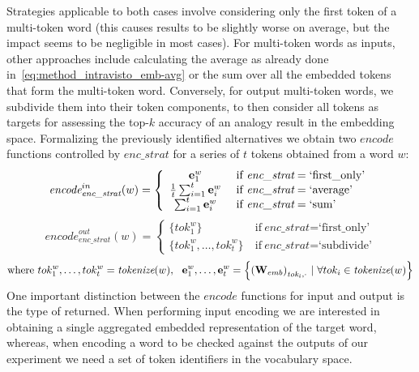 Strategies applicable to both cases involve considering only the first token of a multi-token word (this causes results to be slightly worse on average, but the impact seems to be negligible in most cases).
For multi-token words as inputs, other approaches include calculating the average as already done in~\cref{eq:method_intravisto_emb-avg} or the sum over all the embedded tokens that form the multi-token word.
Conversely, for output multi-token words, we subdivide them into their token components, to then consider all tokens as targets for assessing the top-$k$ accuracy of an analogy result in the embedding space.
Formalizing the previously identified alternatives we obtain two $\textit{encode}$ functions controlled by $\textit{enc\_strat}$ for a series of $t$ tokens obtained from a word $w$:
\begin{equation}
    \label{eq:method_embeddings_multitok-in}
    {\textit{encode}}_{\textit{enc\_strat}}^{in}(w) = 
    \left\{
    \begin{array}{cl}
        \gbm{e}_1^w &\ \text{if}\ \textit{enc\_strat} = \text{`first\_only'} \\
        \frac{1}{t}\sum_{i=1}^{t}{\gbm{e}_i^w} &\ \text{if}\ \textit{enc\_strat} = \text{`average'} \\
        \sum_{i=1}^{t}{\gbm{e}_i^w} &\ \text{if}\ \textit{enc\_strat} = \text{`sum'}
    \end{array}
    \right.
\end{equation}
\begin{equation}
    \label{eq:method_embeddings_multitok-out}
    {\textit{encode}}_{\textit{enc\_strat}}^{out}(w) = 
    \left\{
    \begin{array}{cl}
        \{ tok_1^w \} &\ \text{if}\ \textit{enc\_strat} = \text{`first\_only'} \\
        \{ tok_1^w, \ldots, tok_t^w \} &\ \text{if}\ \textit{enc\_strat} = \text{`subdivide'}
    \end{array}
    \right.
\end{equation}
\vspace{0.25em}
\begin{equation*}
    \text{where}\  tok_1^w,\ldots,tok_t^w = \textit{tokenize}(w)
    ,\ \ \bm{\mathbf{e}}_1^w, \ldots, \bm{\mathbf{e}}_{t}^w = \Bigl\{ {{(\bm{\mathbf{W}}_{emb})}_{\textit{tok}_{i},\cdot}} \ |\ \forall tok_i \in \textit{tokenize}(w) \Bigr\}
\end{equation*}
One important distinction between the $\textit{encode}$ functions for input and output is the type of  returned.
When performing input encoding we are interested in obtaining a single aggregated embedded representation of the target word, whereas, when encoding a word to be checked against the outputs of our experiment we need a set of token identifiers in the vocabulary space.

